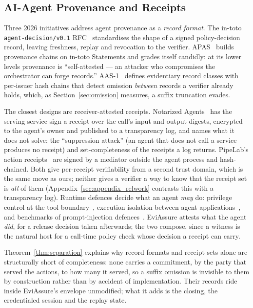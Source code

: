 \documentclass[letterpaper,10pt,twocolumn]{article}
\theoremstyle{definition}
\begin{document}
\subsection{AI-Agent Provenance and Receipts}\label{sec:related-2026}
Three 2026 initiatives address agent provenance as a \emph{record format}. The in-toto \texttt{agent-decision/v0.1} RFC~\cite{intoto2026agent-decision} standardises the shape of a signed policy-decision record, leaving freshness, replay and revocation to the verifier. APAS~\cite{apas2026agent-provenance} builds provenance chains on in-toto Statements and grades itself candidly: at its lower levels provenance is ``self-attested --- an attacker who compromises the orchestrator can forge records.'' AAS-1~\cite{aas12026agent-audit} defines evidentiary record classes with per-issuer hash chains that detect omission \emph{between} records a verifier already holds, which, as Section~\ref{sec:omission} measures, a suffix truncation evades.

The closest designs are receiver-attested receipts. Notarized Agents~\cite{notarized2026agents} has the serving service sign a receipt over the call's input and output digests, encrypted to the agent's owner and published to a transparency log, and names what it does not solve: the ``suppression attack'' (an agent that does not call a service produces no receipt) and set-completeness of the receipts a log returns. PipeLab's action receipts~\cite{pipelab2026receipts} are signed by a mediator outside the agent process and hash-chained. Both give per-receipt verifiability from a second trust domain, which is the same move as ours; neither gives a verifier a way to know that the receipt set is \emph{all} of them (Appendix~\ref{sec:appendix_relwork} contrasts this with a transparency log). Runtime defences decide what an agent \emph{may} do: privilege control at the tool boundary~\cite{shi2025progent}, execution isolation between agent applications~\cite{wu2025isolategpt}, and benchmarks of prompt-injection defences~\cite{debenedetti2024agentdojo}. EviAssure attests what the agent \emph{did}, for a release decision taken afterwards; the two compose, since a witness is the natural host for a call-time policy check whose decision a receipt can carry.

Theorem~\ref{thm:separation} explains why record formats and receipt sets alone are structurally short of completeness: none carries a commitment, by the party that served the actions, to how many it served, so a suffix omission is invisible to them by construction rather than by accident of implementation. Their records ride inside EviAssure's envelope unmodified; what it adds is the closing, the credentialed session and the replay state.
\end{document}
